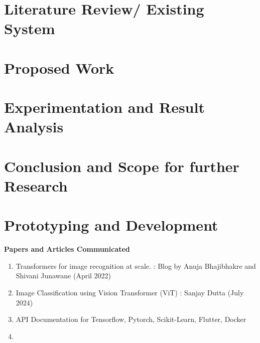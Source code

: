 \documentclass[a4paper, 12pt]{report}
\theoremstyle{definition}
\begin{document}
\chapter{Literature Review/ Existing System}

\chapter{Proposed Work}

\chapter{Experimentation and Result Analysis}
 
\chapter{Conclusion and Scope for further Research}

\appendix
\chapter{Prototyping and Development}



\newpage
\renewcommand{\bibname}{References}





\noindent \textbf{\Large Papers and Articles Communicated}
\begin{enumerate}
	\item Transformers for image recognition at scale. : Blog by Anuja Bhajibhakre and Shivani Junawane (April 2022)
	\item Image Classification using Vision Transformer (ViT) : Sanjay Dutta (July 2024)
	\item API Documentation for Tensorflow, Pytorch, Scikit-Learn, Flutter, Docker
	\item 
\end{enumerate}
\end{document}
